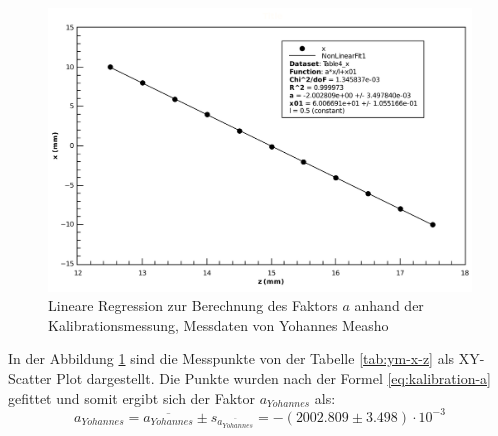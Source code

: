 \begin{figure}[H]
    \center
    \includegraphics[width=.8\textwidth]{images/ym-x-z-fit-a.pdf}
    \caption{Lineare Regression zur Berechnung des Faktors $a$ anhand der Kalibrationsmessung, Messdaten von Yohannes Measho}
    \label{fig:ym-x-z-fit-a}
\end{figure}

In  der  Abbildung \ref{fig:ym-x-z-fit-a} sind die Messpunkte  von  der  Tabelle
\ref{tab:ym-x-z} als XY-Scatter Plot dargestellt. Die  Punkte  wurden  nach  der
Formel  \ref{eq:kalibration-a}   gefittet  und  somit  ergibt  sich  der  Faktor
$a_{Yohannes}$ als:
\begin{equation}
    a_{Yohannes} = \overline{a_{Yohannes}} \pm s_{\overline{a_{Yohannes}}} = -(2002.809 \pm 3.498)\cdot 10^{-3}
    \label{eq:ym-a}
\end{equation}
